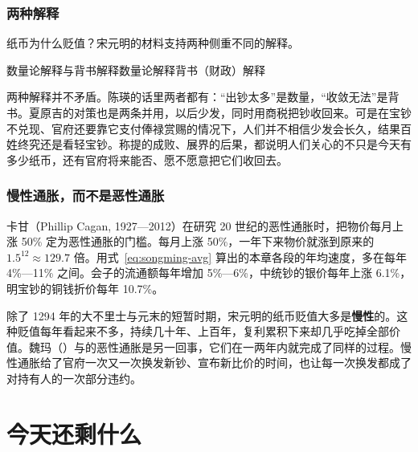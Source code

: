 \subsubsection{两种解释}
纸币为什么贬值？宋元明的材料支持两种侧重不同的解释。

\begin{compare}{数量论解释与背书解释}{数量论解释}{背书（财政）解释}
\end{compare}

两种解释并不矛盾。陈瑛的话里两者都有：“出钞太多”是数量，“收敛无法”是背书。夏原吉的对策也是两条并用，以后少发，同时用商税把钞收回来。可是在宝钞不兑现、官府还要靠它支付俸禄赏赐的情况下，人们并不相信少发会长久，结果百姓终究还是看轻宝钞。称提的成败、展界的后果，都说明人们关心的不只是今天有多少纸币，还有官府将来能否、愿不愿意把它们收回去。

\subsubsection{慢性通胀，而不是恶性通胀}
卡甘（Phillip Cagan, 1927—2012）在研究 20 世纪的恶性通胀时，把物价每月上涨 50\% 定为恶性通胀的门槛\cite{cagan1956}。每月上涨 50\%，一年下来物价就涨到原来的 $1.5^{12}\approx129.7$ 倍。用式~\eqref{eq:songming-avg} 算出的本章各段的年均速度，多在每年 4\%—11\% 之间。会子的流通额每年增加 5\%—6\%，中统钞的银价每年上涨 6.1\%，明宝钞的铜钱折价每年 10.7\%。

除了 1294 年的大不里士与元末的短暂时期，宋元明的纸币贬值大多是\textbf{慢性}的。这种贬值每年看起来不多，持续几十年、上百年，复利累积下来却几乎吃掉全部价值。魏玛（）与的恶性通胀是另一回事，它们在一两年内就完成了同样的过程。慢性通胀给了官府一次又一次换发新钞、宣布新比价的时间，也让每一次换发都成了对持有人的一次部分违约。

\section{今天还剩什么}\label{sec:songming-legacy}

